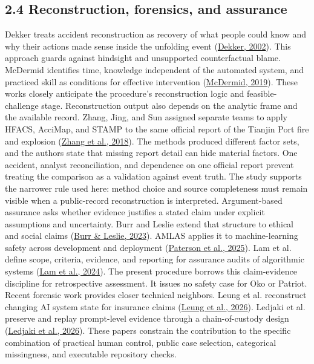 \documentclass[11pt]{article}
\begin{document}
\subsection*{2.4 Reconstruction, forensics, and assurance}
Dekker treats accident reconstruction as recovery of what people could know and why their actions made sense inside the unfolding event (\href{https://doi.org/10.1016/S0022-4375(02)00032-4}{Dekker, 2002}). This approach guards against hindsight and unsupported counterfactual blame. McDermid identifies time, knowledge independent of the automated system, and practiced skill as conditions for effective intervention (\href{https://www.york.ac.uk/assuring-autonomy/news/blog/human-control-ai-autonomy/}{McDermid, 2019}). These works closely anticipate the procedure's reconstruction logic and feasible-challenge stage.
Reconstruction output also depends on the analytic frame and the available record. Zhang, Jing, and Sun assigned separate teams to apply HFACS, AcciMap, and STAMP to the same official report of the Tianjin Port fire and explosion (\href{https://doi.org/10.1007/s11668-018-0534-1}{Zhang et al., 2018}). The methods produced different factor sets, and the authors state that missing report detail can hide material factors. One accident, analyst reconciliation, and dependence on one official report prevent treating the comparison as a validation against event truth. The study supports the narrower rule used here: method choice and source completeness must remain visible when a public-record reconstruction is interpreted.
Argument-based assurance asks whether evidence justifies a stated claim under explicit assumptions and uncertainty. Burr and Leslie extend that structure to ethical and social claims (\href{https://doi.org/10.1007/s43681-022-00178-0}{Burr \& Leslie, 2023}). AMLAS applies it to machine-learning safety across development and deployment (\href{https://doi.org/10.1016/j.ress.2025.111311}{Paterson et al., 2025}). Lam et al. define scope, criteria, evidence, and reporting for assurance audits of algorithmic systems (\href{https://doi.org/10.1145/3630106.3658957}{Lam et al., 2024}). The present procedure borrows this claim-evidence discipline for retrospective assessment. It issues no safety case for Oko or Patriot.
Recent forensic work provides closer technical neighbors. Leung et al. reconstruct changing AI system state for insurance claims (\href{https://arxiv.org/abs/2606.03777}{Leung et al., 2026}). Ledjaki et al. preserve and replay prompt-level evidence through a chain-of-custody design (\href{https://doi.org/10.1145/3774905.3795469}{Ledjaki et al., 2026}). These papers constrain the contribution to the specific combination of practical human control, public case selection, categorical missingness, and executable repository checks.
\end{document}
